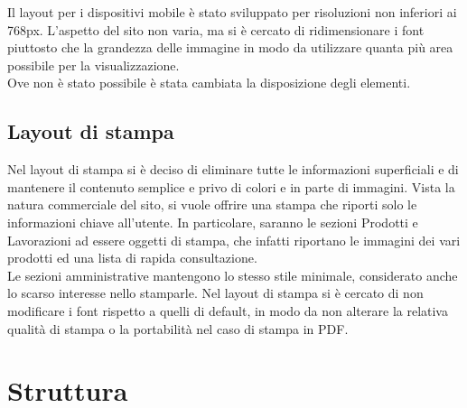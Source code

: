 \documentclass[11pt]{article}
\begin{document}
Il layout per i dispositivi mobile è stato sviluppato per risoluzioni non inferiori ai 768px. L'aspetto del sito non varia, ma si è cercato di ridimensionare i font piuttosto che la grandezza delle immagine in modo da utilizzare quanta più area possibile per la visualizzazione.
\\Ove non è stato possibile è stata cambiata la disposizione degli elementi.

\subsection{Layout di stampa}

Nel layout di stampa si è deciso di eliminare tutte le informazioni superficiali e di mantenere il contenuto semplice e privo di colori e in parte di immagini. Vista la natura commerciale del sito, si vuole offrire una stampa che riporti solo le informazioni chiave all'utente. In particolare, saranno le sezioni Prodotti e Lavorazioni ad essere oggetti di stampa, che infatti riportano le immagini dei vari prodotti ed una lista di rapida consultazione. 
\\Le sezioni amministrative mantengono lo stesso stile minimale, considerato anche lo scarso interesse nello stamparle. Nel layout di stampa si è cercato di non modificare i font rispetto a quelli di default, in modo da non alterare la relativa qualità di stampa o la portabilità nel caso di stampa in PDF.

\newpage
\section{Struttura}
\end{document}
